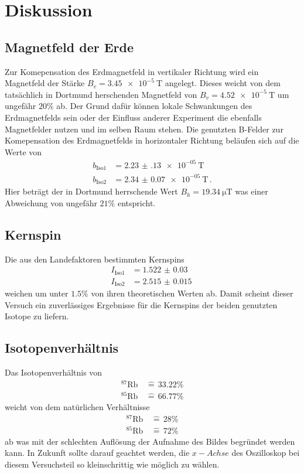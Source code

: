 \newpage
\section{Diskussion}
\label{sec:diskussion}
\subsection{Magnetfeld der Erde}
Zur Komepensation des Erdmagnetfeld in vertikaler Richtung wird ein Magnetfeld der Stärke $B_v = \SI{3.45e-5}{\tesla}$ angelegt.
Dieses weicht von dem tatsächlich in Dortmund herschenden Magnetfeld von $B_v=\SI{4.52e-5}{\tesla}$ \cite{mag_DO_2} um ungefähr $20\%$ ab.
Der Grund dafür können lokale Schwankungen des Erdmagnetfelds sein oder der Einfluss anderer Experiment die ebenfalls Magnetfelder nutzen und im selben Raum stehen.
Die genutzten B-Felder zur Komepensation des Erdmagnetfelds in horizontaler Richtung beläufen sich auf die Werte von
\begin{align*}
b_\text{Iso1} & = \SI{2.23(13)e-05}{\tesla} \\
b_\text{Iso2} &= \SI{2.34(7)e-05}{\tesla} \, .
\end{align*}
Hier beträgt der in Dortmund herrschende Wert $B_h=\SI{19.34}{\micro\tesla}$ was einer Abweichung von ungefähr $21\%$ entspricht.
\subsection{Kernspin}
Die aus den Landefaktoren bestimmten Kernspins 
\begin{align*}
    I_\text{Iso1} &= \SI{1.522(30)}{}\\
    I_\text{Iso2} &= \SI{2.515(15)}{}
\end{align*}
weichen um unter $1.5\%$ von ihren theoretischen Werten ab.
Damit scheint dieser Versuch ein zuverlässiges Ergebnisse für die Kernspins der beiden genutzten Isotope zu liefern.
\subsection{Isotopenverhältnis}
Das Isotopenverhältnis von 
\begin{align*}
    ^{87}\text{Rb} \, &\widehat{=}\, 33.22\% \\
    ^{85}\text{Rb} \, &\widehat{=}\, 66.77\%
\end{align*}
weicht von dem natürlichen Verhältnisse
\begin{align*}
    ^{87}\text{Rb} \, &\widehat{=}\, 28\% \\
    ^{85}\text{Rb} \, &\widehat{=}\, 72\%
\end{align*}
ab was mit der schlechten Auflösung der Aufnahme des Bildes begründet werden kann.
In Zukunft sollte darauf geachtet werden, die $x-Achse$ des Oszilloskop bei diesem Versuchsteil so kleinschrittig wie möglich zu wählen.
